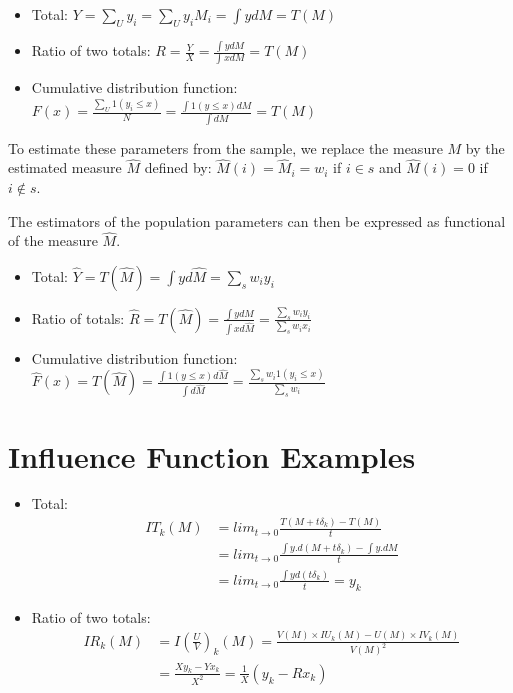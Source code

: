 \documentclass[]{book}
\begin{document}
\begin{itemize}
\item
  Total: \(Y=\sum_Uy_i=\sum_U y_iM_i=\int ydM=T(M)\)
\item
  Ratio of two totals:
  \(R=\frac{Y}{X}=\frac{\int y dM}{\int x dM}=T(M)\)
\item
  Cumulative distribution function:
  \(F(x)=\frac{\sum_U 1(y_i\leq x)}{N}=\frac{\int 1(y\leq x)dM}{\int{dM}}=T(M)\)
\end{itemize}

To estimate these parameters from the sample, we replace the measure
\(M\) by the estimated measure \(\hat{M}\) defined by:
\(\hat{M}(i)=\hat{M}_i= w_i\) if \(i\in s\) and \(\hat{M}(i)=0\) if
\(i\notin s\).

The estimators of the population parameters can then be expressed as
functional of the measure \(\hat{M}\).

\begin{itemize}
\item
  Total: \(\hat{Y}=T(\hat{M})=\int yd\hat{M}=\sum_s w_iy_i\)
\item
  Ratio of totals:
  \(\hat{R}=T(\hat{M})=\frac{\int y d\hat{M}}{\int x d\hat{M}}=\frac{\sum_s w_iy_i}{\sum_s w_ix_i}\)
\item
  Cumulative distribution function:
  \(\hat{F}(x)=T(\hat{M})=\frac{\int 1(y\leq x)d\hat{M}}{\int{d\hat{M}}}=\frac{\sum_s w_i 1(y_i\leq x)}{\sum_s w_i}\)
\end{itemize}

\section{Influence Function Examples}\label{influence-function-examples}

\begin{itemize}
\item
  Total: \[
  \begin{aligned}
  IT_k(M)&=lim_{t\rightarrow 0}\frac{T(M+t\delta_k)-T(M)}{t}\\
  &=lim_{t\rightarrow 0}\frac{\int y.d(M+t\delta_k)-\int y.dM}{t}\\
  &=lim_{t\rightarrow 0}\frac{\int yd(t\delta_k)}{t}=y_k  
  \end{aligned}
  \]
\item
  Ratio of two totals: \[
  \begin{aligned}
  IR_k(M)&=I\left(\frac{U}{V}\right)_k(M)=\frac{V(M)\times IU_k(M)-U(M)\times IV_k(M)}{V(M)^2}\\
  &=\frac{X y_k-Y x_k}{X^2}=\frac{1}{X}(y_k-Rx_k)
  \end{aligned}
  \]
\end{itemize}
\end{document}
